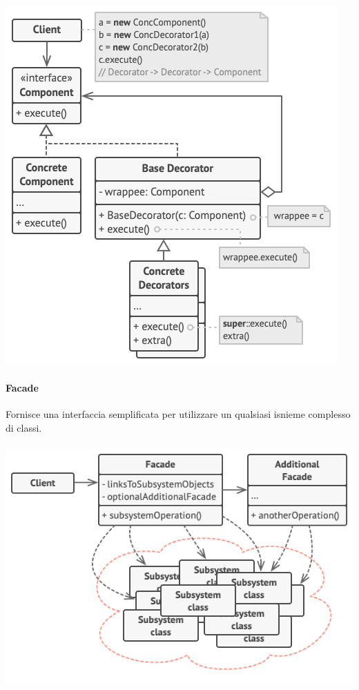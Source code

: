 \documentclass{article}
\begin{document}
            \paragraph{}\includegraphics[scale=0.5]{./img/decorator.png}

            \paragraph{Facade} Fornisce una interfaccia semplificata per utilizzare un qualsiasi isnieme complesso di classi.
            \paragraph{}\includegraphics[scale=0.5]{./img/facade.png}
\end{document}
